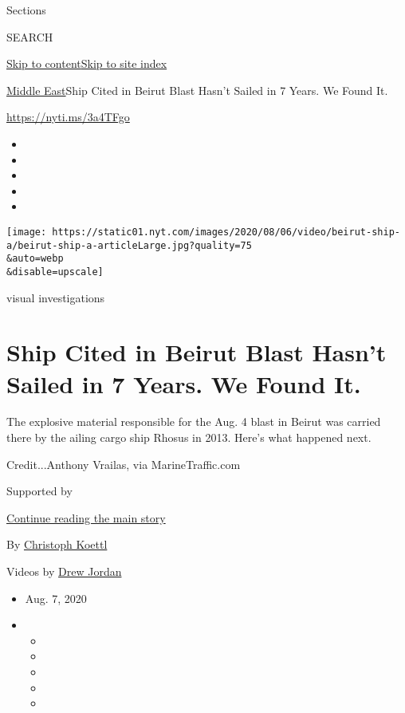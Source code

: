 Sections

SEARCH

\protect\hyperlink{site-content}{Skip to
content}\protect\hyperlink{site-index}{Skip to site index}

\href{/section/world/middleeast}{Middle East}\textbar{}Ship Cited in
Beirut Blast Hasn't Sailed in 7 Years. We Found It.

\href{https://nyti.ms/3a4TFgo}{https://nyti.ms/3a4TFgo}

\begin{itemize}
\item
\item
\item
\item
\item
\end{itemize}

\texttt{[image: https://static01.nyt.com/images/2020/08/06/video/beirut-ship-a/beirut-ship-a-articleLarge.jpg?quality=75\\\&auto=webp\\\&disable=upscale]}

visual investigations

\hypertarget{ship-cited-in-beirut-blast-hasnt-sailed-in-7-years-we-found-it}{%
\section{Ship Cited in Beirut Blast Hasn't Sailed in 7 Years. We Found
It.}\label{ship-cited-in-beirut-blast-hasnt-sailed-in-7-years-we-found-it}}

The explosive material responsible for the Aug. 4 blast in Beirut was
carried there by the ailing cargo ship Rhosus in 2013. Here's what
happened next.

Credit...Anthony Vrailas, via MarineTraffic.com

Supported by

\protect\hyperlink{after-sponsor}{Continue reading the main story}

By \href{https://www.nytimes.com/by/christoph-koettl}{Christoph Koettl}

Videos by \href{https://www.nytimes.com/by/drew-jordan}{Drew Jordan}

\begin{itemize}
\item
  Aug. 7, 2020
\item
  \begin{itemize}
  \item
  \item
  \item
  \item
  \item
  \end{itemize}
\end{itemize}

